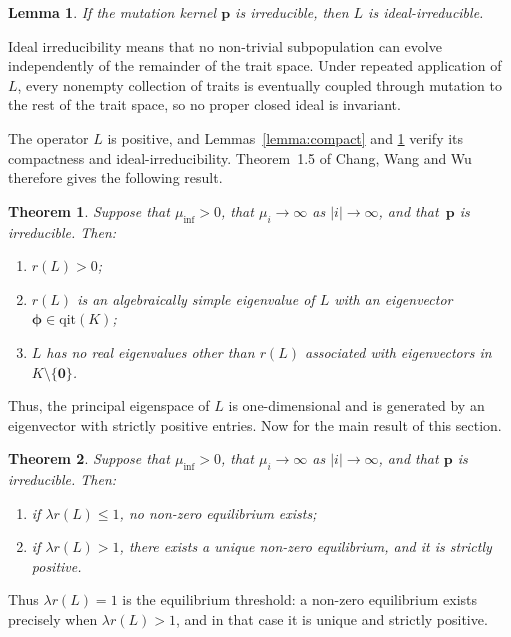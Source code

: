 \documentclass[12pt]{article}
\newtheorem{lemma}{Lemma}
\newtheorem{theorem}{Theorem}
\newcommand{\muinf}{\ensuremath{\mu_{\inf}}}
\newcommand{\bp}{\boldsymbol{p}}
\newcommand{\bphi}{\boldsymbol{\phi}}
\newcommand{\qit}{\text{qit}}
\newcommand{\bzero}{\boldsymbol{0}}
\begin{document}
\begin{lemma}
\label{lemma:ideal}
If the mutation kernel $\bp$ is irreducible, then $L$ is
ideal-irreducible.
\end{lemma}

Ideal irreducibility means that no non-trivial subpopulation can evolve
independently of the remainder of the trait space. Under repeated
application of $L$, every nonempty collection of traits is eventually
coupled through mutation to the rest of the trait space, so no proper
closed ideal is invariant.

The operator $L$ is positive, and Lemmas~\ref{lemma:compact} and
\ref{lemma:ideal} verify its compactness and
ideal-irreducibility. Theorem~1.5 of Chang, Wang and
Wu~\cite{CWW20} therefore gives the following result.

\begin{theorem}
\label{CWW}
Suppose that $\muinf>0$, that $\mu_i\to\infty$ as
$|i|\to\infty$, and that~$\bp$ is irreducible. Then:
\begin{enumerate}
\item[(i)] $r(L)>0$;
\item[(ii)] $r(L)$ is an algebraically simple eigenvalue of $L$ with
an eigenvector $\bphi\in\qit(K)$;
\item[(iii)] $L$ has no real eigenvalues other than $r(L)$ associated
with eigenvectors in $K\setminus\{\bzero\}$.
\end{enumerate}
\end{theorem}

Thus, the principal eigenspace of $L$ is one-dimensional and is
generated by an eigenvector with strictly positive entries.
Now for the main result of this section.

\begin{theorem}
\label{critical}
Suppose that $\muinf>0$, that $\mu_i\to\infty$ as
$|i|\to\infty$, and that $\bp$ is irreducible. Then:
\begin{enumerate}
\item[(i)] if $\lambda r(L)\leq1$, no non-zero equilibrium exists;
\item[(ii)] if $\lambda r(L)>1$, there exists a unique non-zero
equilibrium, and it is strictly positive.
\end{enumerate}
\end{theorem}

Thus $\lambda r(L)=1$ is the equilibrium threshold: a non-zero
equilibrium exists precisely when $\lambda r(L)>1$, and in that case it
is unique and strictly positive.
\end{document}
